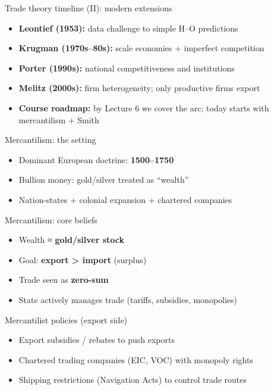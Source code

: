 \documentclass[
  ignorenonframetext,
  aspectratio=169,
]{beamer}
\makeatletter
\providecommand{\tightlist}{%
  \setlength{\itemsep}{0pt}\setlength{\parskip}{0pt}}
\let\quarto@originallabel\label
\DeclareRobustCommand*{\label}[1]{\quarto@originallabel{#1}}
\makeatother
\begin{document}
\begin{frame}{Trade theory timeline (II): modern extensions}
\label{trade-theory-timeline-ii-modern-extensions}
\begin{itemize}
\tightlist
\item
  \textbf{Leontief (1953):} data challenge to simple H--O predictions
\item
  \textbf{Krugman (1970s--80s):} scale economies + imperfect competition
\item
  \textbf{Porter (1990s):} national competitiveness and institutions
\item
  \textbf{Melitz (2000s):} firm heterogeneity; only productive firms
  export
\item
  \textbf{Course roadmap:} by Lecture 6 we cover the arc; today starts
  with mercantilism + Smith
\end{itemize}
\end{frame}

\begin{frame}{Mercantilism: the setting}
\label{mercantilism-the-setting}
\begin{itemize}
\tightlist
\item
  Dominant European doctrine: \textbf{1500--1750}
\item
  Bullion money: gold/silver treated as ``wealth''
\item
  Nation-states + colonial expansion + chartered companies
\end{itemize}
\end{frame}

\begin{frame}{Mercantilism: core beliefs}
\label{mercantilism-core-beliefs}
\begin{itemize}
\tightlist
\item
  Wealth ≈ \textbf{gold/silver stock}
\item
  Goal: \textbf{export \textgreater{} import} (surplus)
\item
  Trade seen as \textbf{zero-sum}
\item
  State actively manages trade (tariffs, subsidies, monopolies)
\end{itemize}

\end{frame}

\begin{frame}{Mercantilist policies (export side)}
\label{mercantilist-policies-export-side}
\begin{itemize}
\tightlist
\item
  Export subsidies / rebates to push exports
\item
  Chartered trading companies (EIC, VOC) with monopoly rights
\item
  Shipping restrictions (Navigation Acts) to control trade routes
\end{itemize}
\end{frame}
\end{document}
